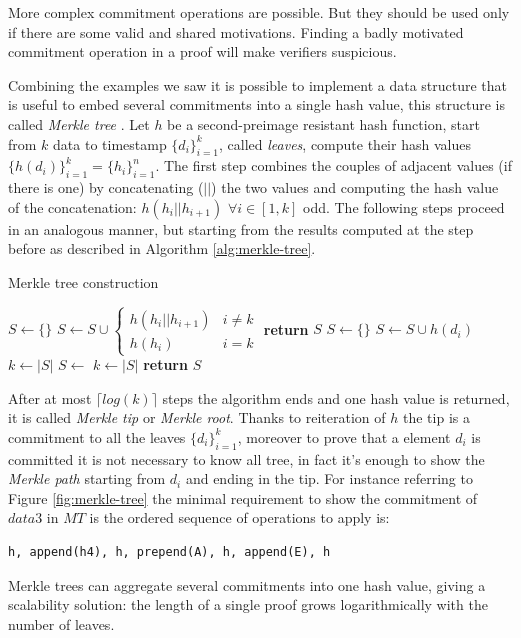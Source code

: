 More complex commitment operations are possible.
But they should be used only if there are some valid and shared motivations. Finding a badly motivated commitment operation in a proof will make verifiers suspicious.

Combining the examples we saw it is possible to implement a data structure that is useful to embed several commitments into a single hash value, 
this structure is called \textit{Merkle tree} \cite{DBLP:conf/sp/Merkle80}. Let $h$ be a second-preimage resistant hash function, start from $k$ data to timestamp $\{d_i\}_{i=1}^k$, called \textit{leaves}, compute their hash values $\{h(d_i)\}_{i=1}^k=\{h_i\}_{i=1}^n$. The first step combines the couples of adjacent values (if there is one) by concatenating ($||$) the two values and computing the hash value of the concatenation: $h(h_i||h_{i+1})$ $\forall i \in [1,k]$ odd. The following steps proceed in an analogous manner, but starting from the results computed at the step before as described in Algorithm \ref{alg:merkle-tree}. 

\begin{algorithm}
	\caption{Merkle tree construction}
	\label{alg:merkle-tree}
	\begin{algorithmic}[1]
		\State $S \gets \{\}$
		\State $S \gets S \cup \begin{cases} 
		h(h_i||h_{i+1}) & i \neq k \\ 
		h(h_i) & i=k           
		\end{cases}$
		\EndFor
		\State \textbf{return} $S$
		\EndProcedure
		\Statex
		 
		\State $S \gets \{\}$
		\State $S\gets S \cup h(d_i)$
		\EndFor
		\State $k\gets |S|$
		\State $S \gets$  
		\State $k\gets |S|$
		\EndWhile
		\State \textbf{return} $S$ 
		\EndProcedure
	\end{algorithmic}
\end{algorithm}

After at most $\lceil log(k) \rceil$ steps the algorithm ends and one hash value is returned, it is called \textit{Merkle tip} or \textit{Merkle root}. 
Thanks to reiteration of $h$ the tip is a commitment to all the leaves $\{d_i\}_{i=1}^k$, moreover to prove that a element $d_i$ is committed it is not necessary to know all tree, in fact it's enough to show the \textit{Merkle path} starting from $d_i$ and ending in the tip. 
For instance referring to Figure \ref{fig:merkle-tree} the minimal requirement to show the commitment of $data3$ in $MT$ is the ordered sequence of operations to apply is:
\begin{verbatim}
h, append(h4), h, prepend(A), h, append(E), h
\end{verbatim}
Merkle trees can aggregate several commitments into one hash value, giving a scalability solution: the length of a single proof grows logarithmically with the number of leaves.

